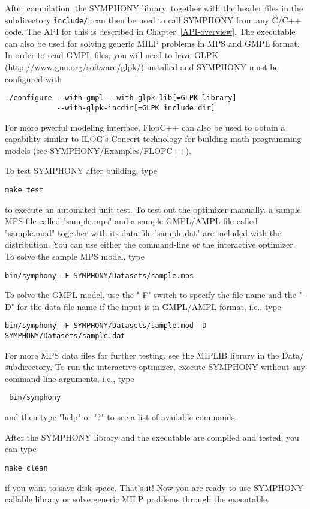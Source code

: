 After compilation, the SYMPHONY library, together with the header files in the
subdirectory \texttt{include/}, can then be used to call SYMPHONY from any
C/C++ code. The API for this is described in Chapter~\ref{API-overview}. The
executable can also be used for solving generic MILP problems in MPS and GMPL
format. In order to read GMPL files, you will need to have GLPK 
(\url{http://www.gnu.org/software/glpk/}) installed and
SYMPHONY must be configured with
{\color{Brown}
\begin{verbatim}
./configure --with-gmpl --with-glpk-lib[=GLPK library] 
            --with-glpk-incdir[=GLPK include dir] 
\end{verbatim}
}
For more pwerful modeling interface, FlopC++ can also be used to obtain a
capability similar to ILOG's Concert technology for building math programming
models (see SYMPHONY/Examples/FLOPC++). 

To test SYMPHONY after building, type
{\color{Brown}
\begin{verbatim}
make test
\end{verbatim}
}
to execute an automated unit test. To test out the optimizer manually. a
sample MPS file called "sample.mps" and a sample GMPL/AMPL file called
"sample.mod" together with its data file "sample.dat" are included with the
distribution. You can use either the command-line or the interactive
optimizer. To solve the sample MPS model, type 
{\color{Brown}
\begin{verbatim}
bin/symphony -F SYMPHONY/Datasets/sample.mps
\end{verbatim}
}
To solve the GMPL model, use the "-F" switch to specify the file
name and the "-D" for the data file name if the input is in GMPL/AMPL format,
i.e., type
{\color{Brown}
\begin{verbatim}
bin/symphony -F SYMPHONY/Datasets/sample.mod -D SYMPHONY/Datasets/sample.dat
\end{verbatim}
}
For more MPS data files for further testing, see the MIPLIB library in the
Data/ subdirectory. To run the interactive optimizer, execute SYMPHONY without
any command-line arguments, i.e., type
{\color{Brown}
\begin{verbatim}
 bin/symphony 
\end{verbatim}
}
and then type "help" or "?" to see a list of available commands.

After the SYMPHONY library and the executable are compiled and tested, you
can type
{\color{Brown}
\begin{verbatim}
make clean 
\end{verbatim}
}
if you want to save disk space. That's it! Now you are ready to use SYMPHONY
callable library or solve generic MILP problems through the executable.


